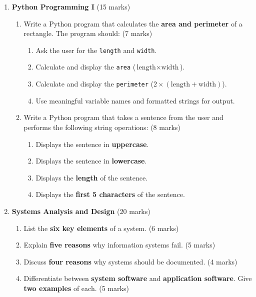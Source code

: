 \documentclass[12pt]{article}
\begin{document}
\begin{enumerate}[left=0pt, label=\bfseries Q\arabic*.]
    \item \textbf{Python Programming I} \hfill (15 marks)
    \begin{enumerate}[label=(\alph*)]
        \item Write a Python program that calculates the \textbf{area and perimeter} of a rectangle. The program should: \hfill (7 marks)
        \begin{enumerate}
            \item Ask the user for the \texttt{length} and \texttt{width}.
            \item Calculate and display the \texttt{area} ($\text{length} \times \text{width}$).
            \item Calculate and display the \texttt{perimeter} ($2 \times (\text{length} + \text{width})$).
            \item Use meaningful variable names and formatted strings for output.
        \end{enumerate}
        \item Write a Python program that takes a sentence from the user and performs the following string operations: \hfill (8 marks)
        \begin{enumerate}
            \item Displays the sentence in \textbf{uppercase}.
            \item Displays the sentence in \textbf{lowercase}.
            \item Displays the \textbf{length} of the sentence.
            \item Displays the \textbf{first 5 characters} of the sentence.
        \end{enumerate}
    \end{enumerate}

    \item \textbf{Systems Analysis and Design} \hfill (20 marks)
    \begin{enumerate}[label=(\alph*)]
        \item List the \textbf{six key elements} of a system. \hfill (6 marks)
        \item Explain \textbf{five reasons} why information systems fail. \hfill (5 marks)
        \item Discuss \textbf{four reasons} why systems should be documented. \hfill (4 marks)
        \item Differentiate between \textbf{system software} and \textbf{application software}. Give \textbf{two examples} of each. \hfill (5 marks)
    \end{enumerate}
\end{enumerate}
\end{document}
